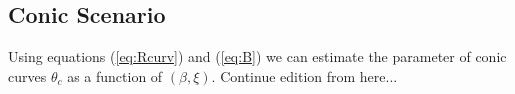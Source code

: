 \subsection{Conic Scenario}

Using equations (\ref{eq:Rcurv}) and (\ref{eq:B}) we can estimate the parameter of conic curves $\theta_c$ as a function of $(\beta,\xi)$. Continue edition from here...








